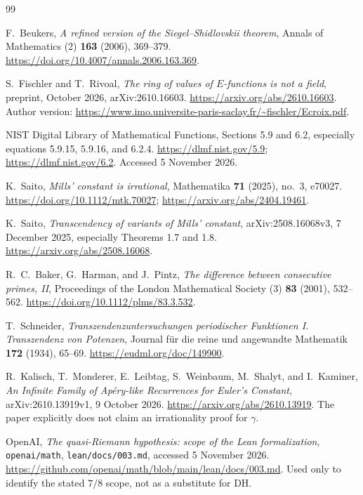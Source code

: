 \documentclass[11pt,a4paper]{article}
\numberwithin{equation}{section}
\theoremstyle{definition}
\theoremstyle{remark}
\begin{document}
\clearpage
\begin{thebibliography}{99}
{}

F.~Beukers, \emph{A refined version of the Siegel--Shidlovskii theorem},
Annals of Mathematics (2) \textbf{163} (2006), 369--379.
\url{https://doi.org/10.4007/annals.2006.163.369}.

S.~Fischler and T.~Rivoal, \emph{The ring of values of $E$-functions is not
a field}, preprint, October 2026, arXiv:2610.16603.
\url{https://arxiv.org/abs/2610.16603}.
Author version: \url{https://www.imo.universite-paris-saclay.fr/~fischler/Ecroix.pdf}.

NIST Digital Library of Mathematical Functions, Sections 5.9 and 6.2,
especially equations 5.9.15, 5.9.16, and 6.2.4.
\url{https://dlmf.nist.gov/5.9}; \url{https://dlmf.nist.gov/6.2}.
Accessed 5 November 2026.

K.~Saito, \emph{Mills' constant is irrational}, Mathematika
\textbf{71} (2025), no.~3, e70027.
\url{https://doi.org/10.1112/mtk.70027};
\url{https://arxiv.org/abs/2404.19461}.

K.~Saito, \emph{Transcendency of variants of Mills' constant},
arXiv:2508.16068v3, 7 December 2025, especially Theorems 1.7 and 1.8.
\url{https://arxiv.org/abs/2508.16068}.

R.~C.~Baker, G.~Harman, and J.~Pintz,
\emph{The difference between consecutive primes, II},
Proceedings of the London Mathematical Society (3) \textbf{83}
(2001), 532--562.
\url{https://doi.org/10.1112/plms/83.3.532}.

T.~Schneider, \emph{Transzendenzuntersuchungen periodischer Funktionen I.
Transzendenz von Potenzen}, Journal f\"ur die reine und angewandte
Mathematik \textbf{172} (1934), 65--69.
\url{https://eudml.org/doc/149900}.

R.~Kalisch, T.~Monderer, E.~Leibtag, S.~Weinbaum, M.~Shalyt, and
I.~Kaminer, \emph{An Infinite Family of Ap\'ery-like Recurrences for
Euler's Constant}, arXiv:2610.13919v1, 9 October 2026.
\url{https://arxiv.org/abs/2610.13919}.
The paper explicitly does not claim an irrationality proof for $\gamma$.

OpenAI, \emph{The quasi-Riemann hypothesis: scope of the Lean formalization},
\texttt{openai/math}, \texttt{lean/docs/003.md}, accessed 5 November 2026.
\url{https://github.com/openai/math/blob/main/lean/docs/003.md}.
Used only to identify the stated $7/8$ scope, not as a substitute for DH.


\end{thebibliography}
\end{document}
